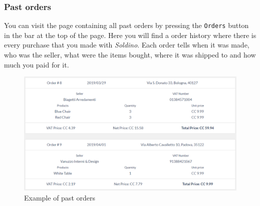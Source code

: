 	\subsubsection{Past orders}
	You can visit the page containing all past orders by pressing the 
	\texttt{Orders} button in the bar at the top of the page.
	Here you will find a order history where there is every purchase that you made 
	with \textit{Soldino}. Each order tells when it was made, who was the 
	seller, what were the items bought, where it was shipped to and how 
	much you paid for it.
	\begin{figure}[H]
		\includegraphics[width=15cm]{res/images/past_orders.png}
		\centering
		\caption{Example of past orders}
	\end{figure}
